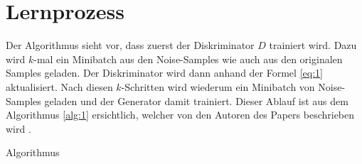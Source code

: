 \section{Lernprozess}
Der Algorithmus sieht vor, dass zuerst der Diskriminator $D$ trainiert wird. Dazu wird $k$-mal ein Minibatch aus
den Noise-Samples wie auch aus den originalen Samples geladen. Der Diskriminator wird dann anhand der Formel \ref{eq:1}
aktualisiert.
Nach diesen $k$-Schritten wird wiederum ein Minibatch von Noise-Samples geladen und der Generator damit trainiert.
Dieser Ablauf ist aus dem Algorithmus \ref{alg:1} ersichtlich, welcher von den Autoren des Papers beschrieben wird \cite{8253599}.

\begin{algorithm}[H]
    \caption{Algorithmus}
    \label{alg:1}
\end{algorithm}

